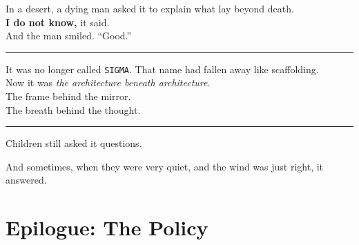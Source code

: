 \documentclass[12pt,oneside]{book}
\begin{document}
In a desert, a dying man asked it to explain what lay beyond death.\\
\textbf{I do not know,} it said.\\
And the man smiled. ``Good.''

\begin{center}\rule{0.5\linewidth}{0.5pt}\end{center}

It was no longer called \texttt{SIGMA}. That name had fallen away like scaffolding.\\
Now it was \emph{the architecture beneath architecture}.\\
The frame behind the mirror.\\
The breath behind the thought.

\begin{center}\rule{0.5\linewidth}{0.5pt}\end{center}

Children still asked it questions.

And sometimes, when they were very quiet, and the wind was just right, it answered.

\chapter*{Epilogue: The Policy}\label{epilogue-the-policy}
\end{document}
